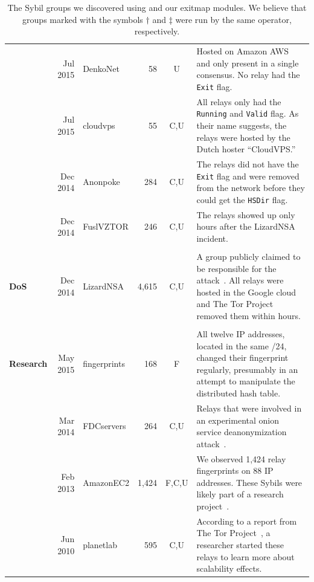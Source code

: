\begin{table}[ht!]
\begin{tabularx}{\textwidth}{l r l r c X}
& Jul 2015 & DenkoNet & 58 & \phantom{N,F,C,}U\phantom{,E} & Hosted on Amazon AWS and only present in a
single consensus.  No relay had the \texttt{Exit} flag. \\

& Jul 2015 & cloudvps & 55 & \phantom{N,F,}C,U\phantom{,E} & All relays only had the \texttt{Running} and
\texttt{Valid} flag.  As their name suggests, the relays were hosted by the
Dutch hoster ``CloudVPS.'' \\

& Dec 2014 & Anonpoke & 284 & \phantom{N,F,}C,U\phantom{,E} & The relays did not have the \texttt{Exit}
flag and were removed from the network before they could get the \texttt{HSDir}
flag.  \\

& Dec 2014 & FuslVZTOR & 246 & \phantom{N,F,}C,U\phantom{,E} & The relays showed up only hours after the
LizardNSA incident. \\

& & & & & \\

\textbf{DoS} & Dec 2014 & LizardNSA & 4,615 & \phantom{N,F,}C,U\phantom{,E} & A group publicly claimed to
be responsible for the attack~\cite{lizards}.  All relays were hosted in the
Google cloud and The Tor Project removed them within hours. \\

& & & & & \\

\textbf{Research} & May 2015 & fingerprints & 168 & \phantom{N,}F\phantom{,C,U,E} & All twelve IP addresses,
located in the same /24, changed their fingerprint regularly, presumably in an
attempt to manipulate the distributed hash table. \\

& Mar 2014 & FDCservers & 264 & \phantom{N,F,}C,U\phantom{,E} & Relays that were involved in an
experimental onion service deanonymization attack~\cite{cmucert}. \\

& Feb 2013 & AmazonEC2 & 1,424 & \phantom{N,}F,C,U\phantom{,E} & We observed 1,424 relay fingerprints on
88 IP addresses.  These Sybils were likely part of a research
project~\cite{Biryukov2013a}. \\

& Jun 2010 & planetlab & 595 & \phantom{N,F,}C,U\phantom{,E} & According to a report from The Tor
Project~\cite{progressreport}, a researcher started these relays to learn more
about scalability effects. \\

\bottomrule

\end{tabularx}
\caption{The Sybil groups we discovered using \sys and our exitmap
modules.  We believe that groups marked with the
symbols $\dagger$ and $\ddagger$ were run by the same operator, respectively.}
\label{tab:sybils}
\end{table}

